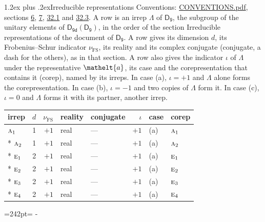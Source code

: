 \documentclass[10pt,a4paper]{article}
\makeatletter
\renewcommand\section{\@startsection{section}{1}{\z@}{-3ex plus -1ex minus -.2ex}%
  {1.2ex plus .2ex}{\normalfont\large\sffamily\bfseries\color{parttitle}}}
\newcommand{\needspace}[1]{\par\penalty-100\begingroup\dimen0=#1\relax\dimen2=\pagegoal
  \advance\dimen2-\pagetotal\ifdim\dimen0>\dimen2\relax\ifdim\dimen2>0pt\vfil\break\fi\fi
  \endgroup}
\numberwithin{equation}{section}
\newcommand{\eltfont}[1]{{\let\sigma\eltsigma\mathelt{#1}}}
\newcommand{\grp}[1]{\mathsf{#1}}
\newcommand{\irr}[1]{\text{\normalfont\scshape #1}}
\newcommand{\elt}[1]{\eltfont{#1}}
\newcommand{\fsind}{\nu_{\mathrm{FS}}}
\makeatother
\begin{document}
\section{Irreducible representations}\label{s:irreps}
Conventions: \href{../../CONVENTIONS.pdf}{CONVENTIONS.pdf}, sections \href{../../../rotation/CONVENTIONS.pdf\#conv.6}{6}, \href{../../../rotation/CONVENTIONS.pdf\#conv.7}{7}, \href{../../CONVENTIONS.pdf\#conv.32.1}{32.1} and \href{../../CONVENTIONS.pdf\#conv.32.3}{32.3}.
\leavevmode\label{n:irrep.Delta}A row is an irrep $\Lambda$ of $\grp{D_{9}}$, the subgroup of the unitary elements of $\grp{D_{9d}}(\grp{D_{9}})$, in the order of the section Irreducible representations of the document of \href{../../../rotation/data/pdf/D9.pdf}{$\grp{D_{9}}$}. \label{n:index.dimension}\label{n:index.frobenius}\label{n:head.irrep}\label{n:head.reality}\label{n:head.conjugate}A row gives its dimension $d$, its Frobenius--Schur indicator $\fsind$, its reality and its complex conjugate (conjugate, a dash for the others), as in that section. \label{n:head.case.corep}\label{n:head.corep}A row also gives the indicator $\iota$ of $\Lambda$ under the representative $\elt{a}$, its case and the corepresentation that contains it (corep), named by its irreps. In case (a), $\iota = +1$ and $\Lambda$ alone forms the corepresentation. In case (b), $\iota = -1$ and two copies of $\Lambda$ form it. In case (c), $\iota = 0$ and $\Lambda$ forms it with its partner, another irrep.
\setlength{\emergencystretch}{2em}\par\setlength{\emergencystretch}{0pt}
{\small\renewcommand{\arraystretch}{1.25}\setlength{\tabcolsep}{4pt}\begin{longtable}{@{}lrrllrll@{}}\toprule
irrep & $d$ & $\fsind$ & reality & conjugate & $\iota$ & case & corep\\\midrule\endhead
\bottomrule\endfoot\endlastfoot
$\irr{a}_{1}$ & 1 & $+1$ & real & --- & $+1$ & (a) & $\irr{a}_{1}$\\*
$\irr{a}_{2}$ & 1 & $+1$ & real & --- & $+1$ & (a) & $\irr{a}_{2}$\\*
$\irr{e}_{1}$ & 2 & $+1$ & real & --- & $+1$ & (a) & $\irr{e}_{1}$\\*
$\irr{e}_{2}$ & 2 & $+1$ & real & --- & $+1$ & (a) & $\irr{e}_{2}$\\*
$\irr{e}_{3}$ & 2 & $+1$ & real & --- & $+1$ & (a) & $\irr{e}_{3}$\\*
$\irr{e}_{4}$ & 2 & $+1$ & real & --- & $+1$ & (a) & $\irr{e}_{4}$\\
\bottomrule\end{longtable}}
\needspace{242pt}
\end{document}
